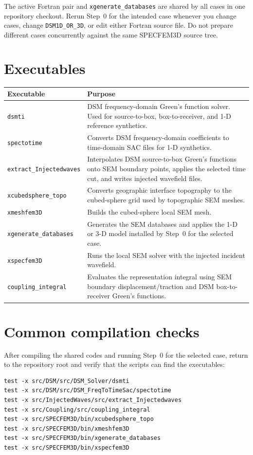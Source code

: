 \documentclass[11pt,oneside]{book}
\DeclareRobustCommand{\code}[1]{\nolinkurl{#1}}
\begin{document}
The active Fortran pair and \code{xgenerate_databases} are shared by all cases
in one repository checkout. Rerun Step~0 for the intended case whenever you
change cases, change \code{DSM1D_OR_3D}, or edit either Fortran source file.
Do not prepare different cases concurrently against the same SPECFEM3D source
tree.

\section{Executables}

\begin{longtable}{L{0.29\textwidth}L{0.62\textwidth}}
\toprule
Executable & Purpose \\
\midrule
\code{dsmti} & DSM frequency-domain Green's function solver. Used for
source-to-box, box-to-receiver, and 1-D reference synthetics. \\
\code{spectotime} & Converts DSM frequency-domain coefficients to time-domain
SAC files for 1-D synthetics. \\
\code{extract_Injectedwaves} & Interpolates DSM source-to-box Green's functions
onto SEM boundary points, applies the selected time cut, and writes injected
wavefield files. \\
\code{xcubedsphere_topo} & Converts geographic interface topography to the
cubed-sphere grid used by topographic SEM meshes. \\
\code{xmeshfem3D} & Builds the cubed-sphere local SEM mesh. \\
\code{xgenerate_databases} & Generates the SEM databases and applies the
1-D or 3-D model installed by Step~0 for the selected case. \\
\code{xspecfem3D} & Runs the local SEM solver with the injected incident
wavefield. \\
\code{coupling_integral} & Evaluates the representation integral using SEM
boundary displacement/traction and DSM box-to-receiver Green's functions. \\
\bottomrule
\end{longtable}

\section{Common compilation checks}

After compiling the shared codes and running Step~0 for the selected case,
return to the repository root and verify that the scripts can find the
executables:
\begin{lstlisting}
test -x src/DSM/src/DSM_Solver/dsmti
test -x src/DSM/src/DSM_FreqToTimeSac/spectotime
test -x src/InjectedWaves/src/extract_Injectedwaves
test -x src/Coupling/src/coupling_integral
test -x src/SPECFEM3D/bin/xcubedsphere_topo
test -x src/SPECFEM3D/bin/xmeshfem3D
test -x src/SPECFEM3D/bin/xgenerate_databases
test -x src/SPECFEM3D/bin/xspecfem3D
\end{lstlisting}
\end{document}
